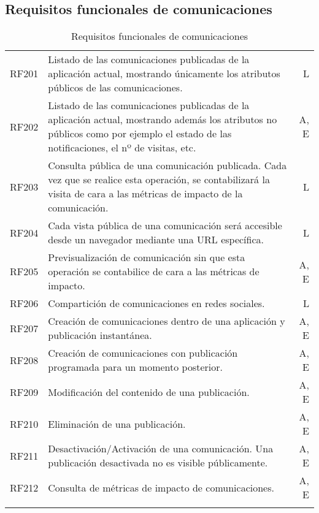 \subsection{Requisitos funcionales de comunicaciones}
\label{cuadro:requisitos-funcionales-de-comunicaciones}
\begin{longtable}{l|p{13cm}|r}
  RF201\label{RF201} & Listado de las comunicaciones publicadas de la aplicación actual, mostrando únicamente los atributos públicos de las comunicaciones. & L \\
  RF202\label{RF202} & Listado de las comunicaciones publicadas de la aplicación actual, mostrando además los atributos no públicos como por ejemplo el estado de las notificaciones, el nº de visitas, etc. & A, E \\
  RF203\label{RF203} & Consulta pública de una comunicación publicada. Cada vez que se realice esta operación, se contabilizará la visita de cara a las métricas de impacto de la comunicación. & L \\
  RF204\label{RF204} & Cada vista pública de una comunicación será accesible desde un navegador mediante una URL específica. & L \\
  RF205\label{RF205} & Previsualización de comunicación sin que esta operación se contabilice de cara a las métricas de impacto. & A, E \\
  RF206\label{RF206} & Compartición de comunicaciones en redes sociales. & L \\
  RF207\label{RF207} & Creación de comunicaciones dentro de una aplicación y publicación instantánea. & A, E \\
  RF208\label{RF208} & Creación de comunicaciones con publicación programada para un momento posterior. & A, E \\
  RF209\label{RF209} & Modificación del contenido de una publicación. & A, E \\
  RF210\label{RF210} & Eliminación de una publicación. & A, E \\
  RF211\label{RF211} & Desactivación/Activación de una comunicación. Una publicación desactivada no es visible públicamente. & A, E \\
  RF212\label{RF212} & Consulta de métricas de impacto de comunicaciones. & A, E \\
  \caption{Requisitos funcionales de comunicaciones} \\
\end{longtable}

